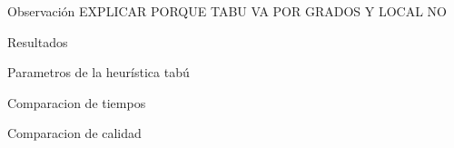 \documentclass[12pt,titlepage]{article}
\begin{document}
	

	\newpage

	

	\newpage

	
	
	\newpage
	
	
	
	\newpage
	
	\begin{section}{Observación}
		EXPLICAR PORQUE TABU VA POR GRADOS Y LOCAL NO
	\end{section}
	
	\begin{section}{Resultados}
		\begin{subsection}{Parametros de la heurística tabú}
		\end{subsection}		

		\begin{subsection}{Comparacion de tiempos}
		\end{subsection}

		\begin{subsection}{Comparacion de calidad}
		\end{subsection}
	\end{section}
	
\end{document}
